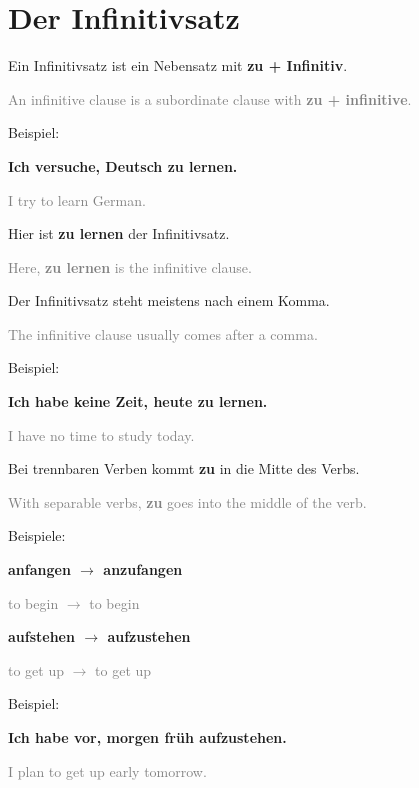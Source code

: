 \documentclass[a4paper]{article}
\begin{document}
    
    \section{Der Infinitivsatz}
        
        Ein Infinitivsatz ist ein Nebensatz mit \textbf{zu + Infinitiv}.
            
            {\small\textcolor{gray}{An infinitive clause is a subordinate clause with \textbf{zu + infinitive}.}}
        
        Beispiel:
        
        \textbf{Ich versuche, Deutsch zu lernen.}
        
        {\small\textcolor{gray}{I try to learn German.}}
        
        Hier ist \textbf{zu lernen} der Infinitivsatz.
            
            {\small\textcolor{gray}{Here, \textbf{zu lernen} is the infinitive clause.}}
        
        Der Infinitivsatz steht meistens nach einem Komma.
            
            {\small\textcolor{gray}{The infinitive clause usually comes after a comma.}}
        
        Beispiel:
        
        \textbf{Ich habe keine Zeit, heute zu lernen.}
        
        {\small\textcolor{gray}{I have no time to study today.}}
        
        Bei trennbaren Verben kommt \textbf{zu} in die Mitte des Verbs.
            
            {\small\textcolor{gray}{With separable verbs, \textbf{zu} goes into the middle of the verb.}}
        
        Beispiele:
        
        \textbf{anfangen $\rightarrow$ anzufangen}
        
        {\small\textcolor{gray}{to begin $\rightarrow$ to begin}}
        
        \textbf{aufstehen $\rightarrow$ aufzustehen}
        
        {\small\textcolor{gray}{to get up $\rightarrow$ to get up}}
        
        Beispiel:
        
        \textbf{Ich habe vor, morgen früh aufzustehen.}
        
        {\small\textcolor{gray}{I plan to get up early tomorrow.}}
\end{document}
